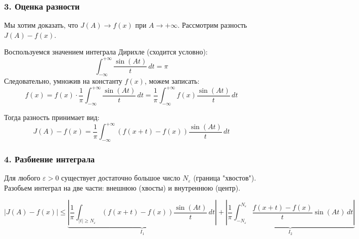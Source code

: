 \documentclass[12pt,a4paper,openany]{book}
\begin{document}
\subsubsection*{3. Оценка разности}
Мы хотим доказать, что $J(A) \to f(x)$ при $A \to +\infty$.
Рассмотрим разность $J(A) - f(x)$.

Воспользуемся значением интеграла Дирихле (сходится условно):
$$ \int_{-\infty}^{+\infty} \frac{\sin(At)}{t} \, dt = \pi $$
Следовательно, умножив на константу $f(x)$, можем записать:
$$ f(x) = f(x) \cdot \frac{1}{\pi} \int_{-\infty}^{+\infty} \frac{\sin(At)}{t} \, dt = \frac{1}{\pi} \int_{-\infty}^{+\infty} f(x) \frac{\sin(At)}{t} \, dt $$

Тогда разность принимает вид:
$$ J(A) - f(x) = \frac{1}{\pi} \int_{-\infty}^{+\infty} \left( f(x+t) - f(x) \right) \frac{\sin(At)}{t} \, dt $$

\subsubsection*{4. Разбиение интеграла}
Для любого $\varepsilon > 0$ существует достаточно большое число $N_\varepsilon$ (граница "хвостов"). Разобьем интеграл на две части: внешнюю (хвосты) и внутреннюю (центр).

\begin{center}
\end{center}

$$ |J(A) - f(x)| \le \underbrace{\left| \frac{1}{\pi} \int_{|t| \ge N_\varepsilon} (f(x+t) - f(x)) \frac{\sin(At)}{t} \, dt \right|}_{I_1} + \underbrace{\left| \frac{1}{\pi} \int_{-N_\varepsilon}^{N_\varepsilon} \frac{f(x+t) - f(x)}{t} \sin(At) \, dt \right|}_{I_2} $$
\end{document}
